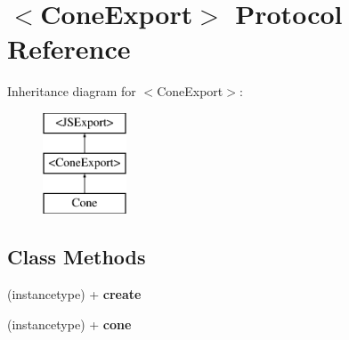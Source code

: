\hypertarget{protocol_cone_export-p}{}\section{$<$Cone\+Export$>$ Protocol Reference}
\label{protocol_cone_export-p}
Inheritance diagram for $<$Cone\+Export$>$\+:\begin{figure}[H]
\begin{center}
\leavevmode
\includegraphics[height=3.000000cm]{protocol_cone_export-p}
\end{center}
\end{figure}
\subsection*{Class Methods}
\begin{DoxyCompactItemize}
\item 
\hypertarget{protocol_cone_export-p_aa8489367c0597f7e0a67a6732e0b74ce}{}(instancetype) + {\bfseries create}\label{protocol_cone_export-p_aa8489367c0597f7e0a67a6732e0b74ce}

\item 
\hypertarget{protocol_cone_export-p_a527e495af6586b9b70909c60dc71d1d0}{}(instancetype) + {\bfseries cone}\label{protocol_cone_export-p_a527e495af6586b9b70909c60dc71d1d0}

\end{DoxyCompactItemize}
